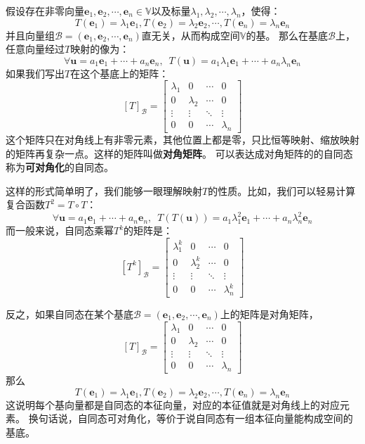 \documentclass[12pt,UTF8,fontset=none]{ctexbook}
\begin{document}
假设存在非零向量$\mathbf{e}_1, \mathbf{e}_2, \cdots, \mathbf{e}_n \in \mathbb{V}$以及标量$\lambda_1, \lambda_2, \cdots, \lambda_n$，使得：
$$ T(\mathbf{e}_1) = \lambda_1 \mathbf{e}_1, T(\mathbf{e}_2) = \lambda_2 \mathbf{e}_2, \cdots , T(\mathbf{e}_n) = \lambda_n \mathbf{e}_n$$
并且向量组$\mathcal{B} = (\mathbf{e}_1, \mathbf{e}_2, \cdots, \mathbf{e}_n)$直无关，从而构成空间$\mathbb{V}$的基。
那么在基底$\mathcal{B}$上，任意向量经过$T$映射的像为：
$$ \forall \mathbf{u} = a_1 \mathbf{e}_1 + \cdots + a_n \mathbf{e}_n, \,\,\, T(\mathbf{u}) = a_1 \lambda_1 \mathbf{e}_1 + \cdots + a_n \lambda_n \mathbf{e}_n$$
如果我们写出$T$在这个基底上的矩阵：
$$ [T]_{\mathcal{B}} = \begin{bmatrix} \lambda_1 & 0 & \cdots & 0 \\ 0 & \lambda_2 & \cdots & 0 \\ \vdots & \vdots & \ddots & \vdots \\ 0 & 0 & \cdots & \lambda_n \end{bmatrix}$$
这个矩阵只在对角线上有非零元素，其他位置上都是零，只比恒等映射、缩放映射的矩阵再复杂一点。这样的矩阵叫做\textbf{对角矩阵}。
可以表达成对角矩阵的的自同态称为\textbf{可对角化}的自同态。

这样的形式简单明了，我们能够一眼理解映射$T$的性质。比如，我们可以轻易计算复合函数$T^2 = T\circ T$：
$$  \forall \mathbf{u} = a_1 \mathbf{e}_1 + \cdots + a_n \mathbf{e}_n, \,\,\, T(T(\mathbf{u})) = a_1 \lambda_1^2 \mathbf{e}_1 + \cdots + a_n \lambda_n^2 \mathbf{e}_n$$
而一般来说，自同态乘幂$T^k$的矩阵是：
$$ [T^k]_{\mathcal{B}} = \begin{bmatrix} \lambda_1^k & 0 & \cdots & 0 \\ 0 & \lambda_2^k & \cdots & 0 \\ \vdots & \vdots & \ddots & \vdots \\ 0 & 0 & \cdots & \lambda_n^k \end{bmatrix}$$

反之，如果自同态在某个基底$\mathcal{B} = (\mathbf{e}_1, \mathbf{e}_2, \cdots, \mathbf{e}_n)$上的矩阵是对角矩阵，
$$ [T]_{\mathcal{B}} = \begin{bmatrix} \lambda_1 & 0 & \cdots & 0 \\ 0 & \lambda_2 & \cdots & 0 \\ \vdots & \vdots & \ddots & \vdots \\ 0 & 0 & \cdots & \lambda_n \end{bmatrix}$$
那么
$$ T(\mathbf{e}_1) = \lambda_1 \mathbf{e}_1, T(\mathbf{e}_2) = \lambda_2 \mathbf{e}_2, \cdots , T(\mathbf{e}_n) = \lambda_n \mathbf{e}_n$$
这说明每个基向量都是自同态的本征向量，对应的本征值就是对角线上的对应元素。
换句话说，自同态可对角化，等价于说自同态有一组本征向量能构成空间的基底。
\end{document}
